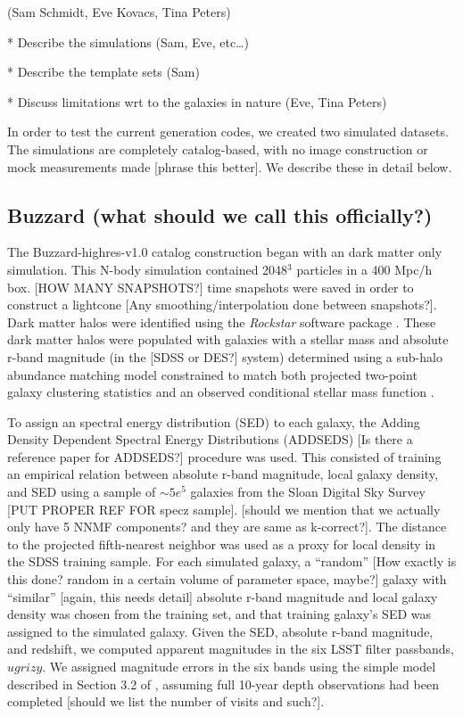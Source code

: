 \documentclass[usenatbib]{mn2e}
\begin{document}
(Sam Schmidt, Eve Kovacs, Tina Peters)

* Describe the simulations (Sam, Eve, etc…)

* Describe the template sets (Sam)

* Discuss limitations wrt to the galaxies in nature (Eve, Tina Peters)

In order to test the current generation codes, we created two simulated datasets.  The simulations are completely catalog-based, with no image construction or mock measurements made [phrase this better].  We describe these in detail below.  

\subsection{Buzzard (what should we call this officially?)}\label{buzzard}

   The Buzzard-highres-v1.0 catalog construction began with an dark matter only simulation.  This N-body simulation contained 2048$^3$ particles in a 400 Mpc/h box.  [HOW MANY SNAPSHOTS?] time snapshots were saved in order to construct a lightcone [Any smoothing/interpolation done between snapshots?].  Dark matter halos were identified using the {\it Rockstar} software package \citep[]{Behroozi:13}.  These dark matter halos were populated with galaxies with a stellar mass and  absolute r-band magnitude (in the [SDSS or DES?] system) determined using a sub-halo abundance matching model constrained to match both projected two-point galaxy clustering statistics and an observed conditional stellar mass function \citep[]{Reddick:13}. 

To assign an spectral energy distribution (SED) to each galaxy, the Adding Density Dependent Spectral Energy Distributions (ADDSEDS) [Is there a reference paper for ADDSEDS?] procedure was used.  This consisted of training an empirical relation between absolute r-band magnitude, local galaxy density, and SED using a sample of $\sim 5e^{5}$ galaxies from the Sloan Digital Sky Survey [PUT PROPER REF FOR specz sample]. [should we mention that we actually only have 5 NNMF components? and they are same as k-correct?].  The distance to the projected fifth-nearest neighbor was used as a proxy for local density in the SDSS training sample.  For each simulated galaxy, a ``random'' [How exactly is this done? random in a certain volume of parameter space, maybe?] galaxy with ``similar'' [again, this needs detail] absolute r-band magnitude and local galaxy density was chosen from the training set, and that training galaxy's SED was assigned to the simulated galaxy.  Given the SED, absolute r-band magnitude, and redshift, we computed apparent magnitudes in the six LSST filter passbands, $ugrizy$.  We assigned magnitude errors in the six bands using the simple model described in Section 3.2 of \citet[]{Ivezic:08}, assuming full 10-year depth observations had been completed [should we list the number of visits and such?].
\end{document}
